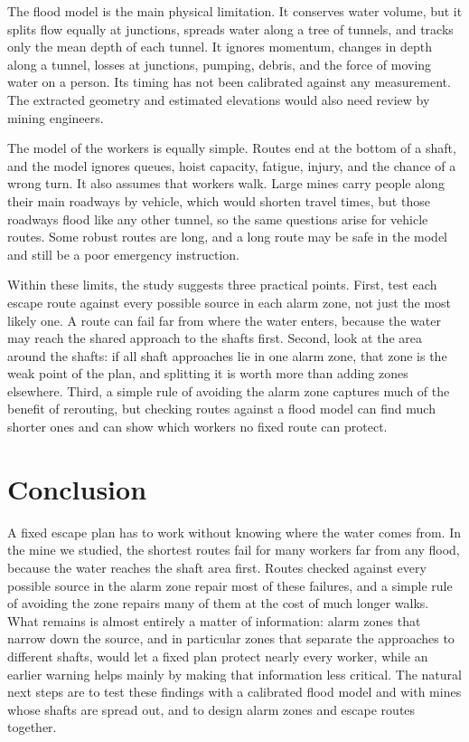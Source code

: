 \documentclass[11pt,a4paper]{article}
\begin{document}
The flood model is the main physical limitation. It conserves water volume, but it splits flow equally at junctions, spreads water along a tree of tunnels, and tracks only the mean depth of each tunnel. It ignores momentum, changes in depth along a tunnel, losses at junctions, pumping, debris, and the force of moving water on a person. Its timing has not been calibrated against any measurement. The extracted geometry and estimated elevations would also need review by mining engineers.

The model of the workers is equally simple. Routes end at the bottom of a shaft, and the model ignores queues, hoist capacity, fatigue, injury, and the chance of a wrong turn. It also assumes that workers walk. Large mines carry people along their main roadways by vehicle, which would shorten travel times, but those roadways flood like any other tunnel, so the same questions arise for vehicle routes. Some robust routes are long, and a long route may be safe in the model and still be a poor emergency instruction.

Within these limits, the study suggests three practical points. First, test each escape route against every possible source in each alarm zone, not just the most likely one. A route can fail far from where the water enters, because the water may reach the shared approach to the shafts first. Second, look at the area around the shafts: if all shaft approaches lie in one alarm zone, that zone is the weak point of the plan, and splitting it is worth more than adding zones elsewhere. Third, a simple rule of avoiding the alarm zone captures much of the benefit of rerouting, but checking routes against a flood model can find much shorter ones and can show which workers no fixed route can protect.

\section{Conclusion}
A fixed escape plan has to work without knowing where the water comes from. In the mine we studied, the shortest routes fail for many workers far from any flood, because the water reaches the shaft area first. Routes checked against every possible source in the alarm zone repair most of these failures, and a simple rule of avoiding the zone repairs many of them at the cost of much longer walks. What remains is almost entirely a matter of information: alarm zones that narrow down the source, and in particular zones that separate the approaches to different shafts, would let a fixed plan protect nearly every worker, while an earlier warning helps mainly by making that information less critical. The natural next steps are to test these findings with a calibrated flood model and with mines whose shafts are spread out, and to design alarm zones and escape routes together.
\end{document}
